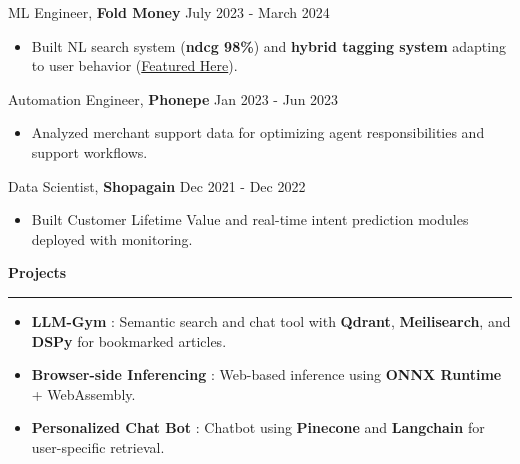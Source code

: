 \documentclass{article}%
\begin{document}
\vspace{-2mm}
ML Engineer,\textbf{ Fold Money} \hfill{July 2023 - March 2024}
\vspace{-1mm}
\begin{itemize}
\setlength\itemsep{0.01em}
\item Built NL search system (\textbf{ndcg 98\%}) and \textbf{hybrid tagging system} adapting to user behavior (\href{https://fold.money/blog/automating-transaction-tagging}{Featured Here}).
\end{itemize}
\vspace{-2mm}
Automation Engineer,\textbf{ Phonepe} \hfill{Jan 2023 - Jun 2023}
\vspace{-1mm}
\begin{itemize}
\setlength\itemsep{0.01em}
\item Analyzed merchant support data for optimizing agent responsibilities and support workflows.
\end{itemize}
\vspace{-2mm}
Data Scientist,\textbf{ Shopagain} \hfill{Dec 2021 - Dec 2022}
\vspace{-1mm}
\begin{itemize}
\setlength\itemsep{0.01em}
\item Built Customer Lifetime Value and real-time intent prediction modules deployed with monitoring.
\end{itemize}

\vspace{-1mm}
\begin{flushleft}
\bf{\Large{Projects}}
\end{flushleft}
\vspace{-2mm}
\noindent\rule{\textwidth}{0.4pt}
\vspace{-1mm}
\begin{itemize}
\setlength\itemsep{0.01em}
\item \textbf{LLM-Gym} : Semantic search and chat tool with \textbf{Qdrant}, \textbf{Meilisearch}, and \textbf{DSPy} for bookmarked articles.\hfill
\href{https://github.com/RheagalFire/LLM-gym/tree/main/gym_reader}{\faGithub}\hspace{2mm}\href{https://www.linkedin.com/posts/aarish-alam_rag-dspy-knowledgemanagement-activity-7288050529685975042-uNUi?utm_source=share&utm_medium=member_desktop&rcm=ACoAAC3guzgBLJ3ujDvj7NqMMjTw1_2SwpYn4dE}{\faLinkedin}

\item \textbf{Browser-side Inferencing} : Web-based inference using \textbf{ONNX Runtime} + WebAssembly.\hfill
\href{https://github.com/RheagalFire/Browserside-Inferencing}{\faGithub}

\item \textbf{Personalized Chat Bot} : Chatbot using \textbf{Pinecone} and \textbf{Langchain} for user-specific retrieval.\hfill
\href{https://github.com/RheagalFire/personalized_chat_bot}{\faGithub}
\end{itemize}
\end{document}
